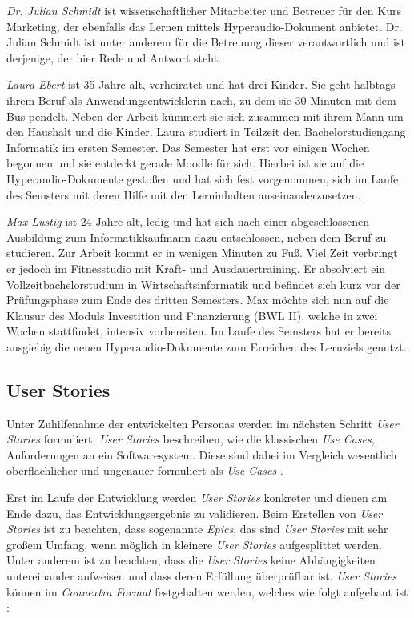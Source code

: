 {\Large\emph{Dr. Julian Schmidt}} ist wissenschaftlicher Mitarbeiter und Betreuer für den Kurs \glqq Marketing\grqq{}, der ebenfalls das Lernen mittels Hyperaudio-Dokument anbietet. Dr. Julian Schmidt ist unter anderem für die Betreuung dieser verantwortlich und ist derjenige, der hier Rede und Antwort steht.
\vspace{.5cm}

{\Large\emph{Laura Ebert}} ist 35 Jahre alt, verheiratet und hat drei Kinder. Sie geht halbtags ihrem Beruf als Anwendungsentwicklerin nach, zu dem sie 30 Minuten mit dem Bus pendelt. Neben der Arbeit kümmert sie sich zusammen mit ihrem Mann um den Haushalt und die Kinder. Laura studiert in Teilzeit den Bachelorstudiengang Informatik im ersten Semester. Das Semester hat erst vor einigen Wochen begonnen und sie entdeckt gerade Moodle für sich. Hierbei ist sie auf die Hyperaudio-Dokumente gestoßen und hat sich fest vorgenommen, sich im Laufe des Semsters mit deren Hilfe mit den Lerninhalten auseinanderzusetzen.
\vspace{.5cm}
 
{\Large\emph{Max Lustig}} ist 24 Jahre alt, ledig und hat sich nach einer abgeschlossenen Ausbildung zum Informatikkaufmann dazu entschlossen, neben dem Beruf zu studieren. Zur Arbeit kommt er in wenigen Minuten zu Fuß. Viel Zeit verbringt er jedoch im Fitnesstudio mit Kraft- und Ausdauertraining. Er absolviert ein Vollzeitbachelorstudium in Wirtschaftsinformatik und befindet sich kurz vor der Prüfungsphase zum Ende des dritten Semesters. Max möchte sich nun auf die Klausur des Moduls \glqq Investition und Finanzierung (BWL II)\grqq{}, welche in zwei Wochen stattfindet, intensiv vorbereiten. Im Laufe des Semsters hat er bereits ausgiebig die neuen Hyperaudio-Dokumente zum Erreichen des Lernziels genutzt.

\par
\endgroup

\subsection{User Stories}
\label{sec:UserStories}
Unter Zuhilfenahme der entwickelten Personas werden im nächsten Schritt \textit{User Stories} formuliert. \textit{User Stories} beschreiben, wie die klassischen \textit{Use Cases}, Anforderungen an ein Softwaresystem. Diese sind dabei im Vergleich wesentlich oberflächlicher und ungenauer formuliert als \textit{Use Cases} \citep{wirdemann2017scrum}.

Erst im Laufe der Entwicklung werden \textit{User Stories} konkreter und dienen am Ende dazu, das Entwicklungsergebnis zu validieren. Beim Erstellen von \textit{User Stories} ist zu beachten, dass sogenannte \textit{Epics}, das sind \textit{User Stories} mit sehr großem Umfang, wenn möglich in kleinere \textit{User Stories} aufgesplittet werden. Unter anderem ist zu beachten, dass die \textit{User Stories} keine Abhängigkeiten untereinander aufweisen und dass deren Erfüllung überprüfbar ist. \textit{User Stories} können im \textit{Connextra Format} festgehalten werden, welches wie folgt aufgebaut ist \citep{cohn2004user}:

